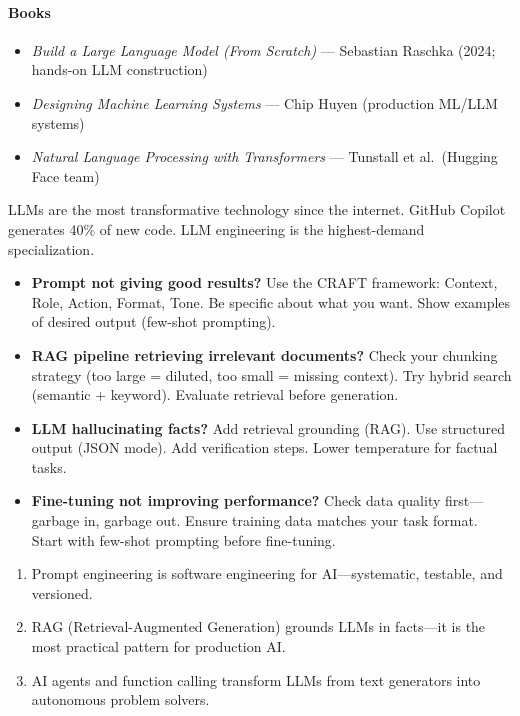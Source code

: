 \documentclass[11pt, a4paper, oneside]{report}
\begin{document}
\paragraph{Books}
\begin{itemize}[leftmargin=*]
\item \emph{Build a Large Language Model (From Scratch)} --- Sebastian Raschka (2024; hands-on LLM construction)
\item \emph{Designing Machine Learning Systems} --- Chip Huyen (production ML/LLM systems)
\item \emph{Natural Language Processing with Transformers} --- Tunstall et al.\ (Hugging Face team)
\end{itemize}


\begin{realworldbox}
LLMs are the most transformative technology since the internet. GitHub Copilot generates 40\% of new code. LLM engineering is the highest-demand specialization.
\end{realworldbox}


\begin{stuckbox}
\begin{itemize}[leftmargin=*]
\item \textbf{Prompt not giving good results?} Use the CRAFT framework: Context, Role, Action, Format, Tone. Be specific about what you want. Show examples of desired output (few-shot prompting).
\item \textbf{RAG pipeline retrieving irrelevant documents?} Check your chunking strategy (too large = diluted, too small = missing context). Try hybrid search (semantic + keyword). Evaluate retrieval before generation.
\item \textbf{LLM hallucinating facts?} Add retrieval grounding (RAG). Use structured output (JSON mode). Add verification steps. Lower temperature for factual tasks.
\item \textbf{Fine-tuning not improving performance?} Check data quality first---garbage in, garbage out. Ensure training data matches your task format. Start with few-shot prompting before fine-tuning.
\end{itemize}
\end{stuckbox}


\begin{takeawaybox}
\begin{enumerate}[leftmargin=*]
\item Prompt engineering is software engineering for AI---systematic, testable, and versioned.
\item RAG (Retrieval-Augmented Generation) grounds LLMs in facts---it is the most practical pattern for production AI.
\item AI agents and function calling transform LLMs from text generators into autonomous problem solvers.
\end{enumerate}
\end{takeawaybox}
\end{document}
